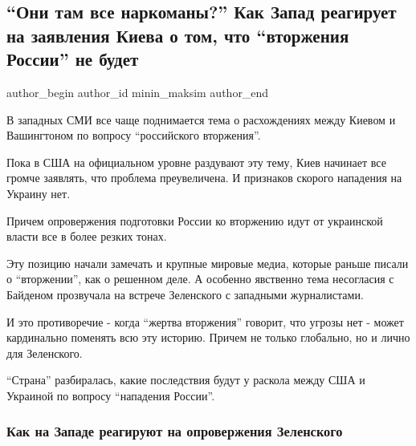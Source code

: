  
 
 
 
 
 
\subsection{\enquote{Они там все наркоманы?} Как Запад реагирует на заявления Киева о том, что \enquote{вторжения России} не будет}
\label{sec:30_01_2022.stz.news.ua.strana.1.narkomany_vtorzhenie}
 
\ifcmt
 author_begin
   author_id minin_maksim
 author_end
\fi

В западных СМИ все чаще поднимается тема о расхождениях между Киевом и
Вашингтоном по вопросу \enquote{российского вторжения}. 


Пока в США на официальном уровне раздувают эту тему, Киев начинает все громче
заявлять, что проблема преувеличена. И признаков скорого нападения на Украину
нет.

Причем опровержения подготовки России ко вторжению идут от украинской власти
все в более резких тонах.

Эту позицию начали замечать и крупные мировые медиа, которые раньше писали о
\enquote{вторжении}, как о решенном деле. А особенно явственно тема несогласия с
Байденом прозвучала на встрече Зеленского с западными журналистами. 

И это противоречие - когда \enquote{жертва вторжения} говорит, что угрозы нет - может
кардинально поменять всю эту историю. Причем не только глобально, но и лично
для Зеленского.

\enquote{Страна} разбиралась, какие последствия будут у раскола между США и Украиной по
вопросу \enquote{нападения России}.

\subsubsection{Как на Западе реагируют на опровержения Зеленского}

